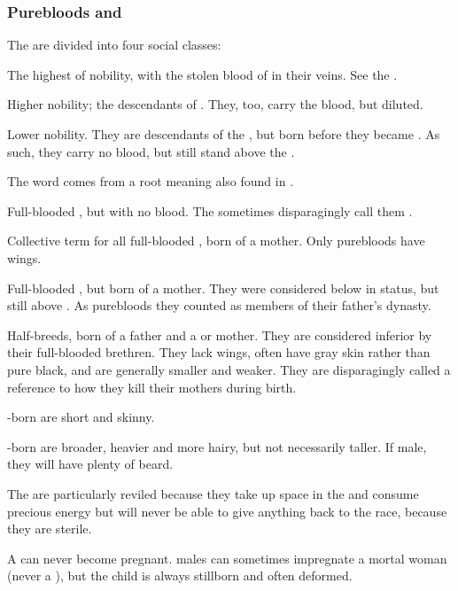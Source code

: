 \subsubsection{Purebloods and \ashenbloods}
The \resphain{} are divided into four social classes:
\begin{gloss}
  \gitem[\satharioth]{\sathariah}
  The highest of \resphan{} nobility, with the stolen blood of \Nexagglachel{} in their veins. 
  See the . 
  
  \gitem[\ketherain]{\ketheran}
  Higher nobility; the descendants of \satharioth. 
  They, too, carry the \draconian{} blood, but diluted.   
  
  \gitem[\ruistheleth]{\ruisthel}
  Lower nobility. 
  They are descendants of the \satharioth, but born before they became \satharioth. 
  As such, they carry no \draconian{} blood, but still stand above the \thelyadeth. 
  
  The word comes from a root  meaning \dash also found in . 
  
  \gitem[\thelyadeth]{\thelyad}
  Full-blooded \resphain, but with no \sathariah{} blood. 
  The \ketherain{} sometimes disparagingly call them . 
  
  Collective term for all full-blooded \resphain{}, born of a \resvil{} mother. 
  Only purebloods have wings. 
  
  \gitem[\gessurim]{\gessur}
  Full-blooded \resphain, but born of a  mother. 
  They were considered below \thelyadeth{} in status, but still above \bezedeth. 
  As purebloods they counted as members of their father's dynasty. 
  
  \gitem[\bezedeth]{\bezed}
  Half-breeds, born of a \resphan{} father and a \human{} or \nephilic{} mother. 
  They are considered inferior by their full-blooded brethren. 
  They lack wings, often have gray skin rather than pure black, and are generally smaller and weaker. 
  They are disparagingly called \quo{\ashenbloods}\dash a reference to how they kill their mothers during birth. 
  
  \Human-born \resphain{} are short and skinny. 
  
  \Nephil-born \resphain{} are broader, heavier and more hairy, but not necessarily taller. 
  If male, they will have plenty of beard. 
  
  The \bezedeth{} are particularly reviled because they take up space in the  and consume precious  energy but will never be able to give anything back to the \resphan{} race, because they are sterile. 
  
  A \bezed{} \resvil{} can never become pregnant. 
  \Bezed{} males can sometimes impregnate a mortal woman (never a \resvil), but the child is always stillborn and often deformed. 
\end{gloss}





